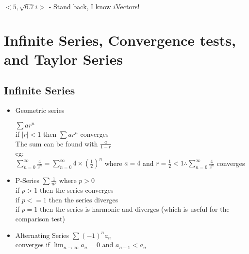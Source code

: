\documentclass{article}
\begin{document}
\(<5,\sqrt{6.7}i>\) - Stand back, I know \(i\)Vectors!\\
\section*{\color{Gray}Infinite Series, Convergence tests, and Taylor
  Series}
  \subsection*{\color{BrickRed}Infinite Series}
  \begin{itemize}
    \item Geometric series\\
      \begin{multicols}{2}
      \subitem \( \sum ar^n \) \\
      if \( |r|<1 \) then \( \sum ar^n \) converges\\
      The sum can be found with \(\frac{a}{1-r}\)\\
      \columnbreak
      \subitem eg:\\
      \( \sum\limits_{n=0}^{\infty} \frac {4} {2^n} =
      \sum\limits_{n=0}^{\infty} 4 \times (\frac {1} {2})^n \) where
      \(a=4\) and \(r=\frac {1} {2} < 1 \therefore \sum\limits_{n=0}^{\infty}
      \frac{4}{2^n} \) converges \\
    \end{multicols}
    \item P-Series
      \subitem \( \sum \frac{1}{n^p}\) where
      \( p>0 \) \\
      if \(p>1\) then the series converges\\
      if \(p<=1\) then the series diverges\\
      if \(p=1\) then the series is harmonic and diverges (which is
      useful for the comparison test)\\
    \item Alternating Series
      \subitem \( \sum (-1)^n a_n \)\\
      converges if \( \lim_{n\rightarrow\infty} a_n=0 \) and \( a_{n+1}<a_n \)\\
  \end{itemize}
\end{document}
